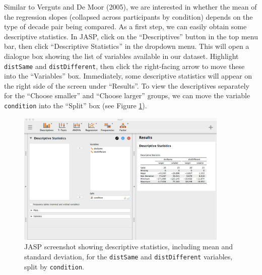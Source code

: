 \documentclass[english,,doc,floatsintext]{apa6}
\begin{document}
Similar to Verguts and De Moor (2005), we are interested in whether the mean of the regression slopes (collapsed across participants by condition) depends on the type of decade pair being compared. As a first step, we can easily obtain some descriptive statistics. In JASP, click on the \enquote{Descriptives} button in the top menu bar, then click \enquote{Descriptive Statistics} in the dropdown menu. This will open a dialogue box showing the list of variables available in our dataset. Highlight \texttt{distSame} and \texttt{distDifferent}, then click the right-facing arrow to move these into the \enquote{Variables} box. Immediately, some descriptive statistics will appear on the right side of the screen under \enquote{Results}. To view the descriptives separately for the \enquote{Choose smaller} and \enquote{Choose larger} groups, we can move the variable \texttt{condition} into the \enquote{Split} box (see Figure \ref{fig:ttestDescriptives}).

\begin{figure}
\centering
\includegraphics[width=0.9\textwidth,height=\textheight]{figures/ttestDescriptives.png}
\caption{\label{fig:ttestDescriptives}JASP screenshot showing descriptive statistics, including mean and standard deviation, for the \texttt{distSame} and \texttt{distDifferent} variables, split by \texttt{condition}.}
\end{figure}
\end{document}
